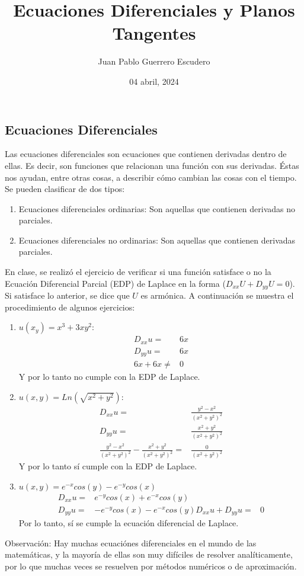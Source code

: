 \documentclass[12pt, letterpaper]{report}
\title{Ecuaciones Diferenciales y Planos Tangentes}
\author{Juan Pablo Guerrero Escudero}
\date{04 abril, 2024}
\begin{document}
\maketitle
\subsection*{Ecuaciones Diferenciales}
Las ecuaciones diferenciales son ecuaciones que contienen derivadas dentro de ellas. Es decir, son funciones 
que relacionan una función con sus derivadas. Éstas nos ayudan, entre otras cosas, a describir cómo cambian las 
cosas con el tiempo. Se pueden clasificar de dos tipos: 
\begin{enumerate}
\item Ecuaciones diferenciales ordinarias: Son aquellas que contienen derivadas no parciales. 
\item Ecuaciones diferenciales no ordinarias: Son aquellas que contienen derivadas parciales. 
\end{enumerate}
En clase, se realizó el ejercicio de verificar si una función satisface o no la Ecuación Diferencial Parcial (EDP) de 
Laplace en la forma ($D_{xx}U + D_{yy}U = 0$). Si satisface lo anterior, se dice que $U$ es armónica. A continuación se 
muestra el procedimiento de algunos ejercicios: \\ 
\begin{enumerate}
\item $u(x_y) = x^3 + 3xy^2$: 
\begin{align*}
    D_{xx}u =& 6x \\
    D_{yy}u =& 6x \\
    6x + 6x \neq& 0
\end{align*} Y por lo tanto no cumple con la EDP de Laplace. 
\item $u(x, y) = Ln(\sqrt{x^2 + y^2})$: 
\begin{align*}
D_{xx}u =& \frac{y^2 - x^2}{(x^2 + y^2)^2}\\
D_{yy}u =& \frac{x^2 + y^2}{(x^2 + y^2)^2} \\
\frac{y^2 - x^2}{(x^2 + y^2)^2} - \frac{x^2 + y^2}{(x^2 + y^2)^2} =& \frac{0}{(x^2 + y^2)^2}
\end{align*} Y por lo tanto sí cumple con la EDP de Laplace. 
\item $u(x, y) = e^{-x}cos(y) -e^{-y}cos(x)$
\begin{align*}
D_{xx}u =& e^{-y}cos(x) + e^{-x}cos(y)\\
D_{yy}u =& -e^{-y}cos(x) - e^{-x}cos(y)
D_{xx}u + D_{yy}u =& 0
\end{align*} Por lo tanto, sí se cumple la ecuación diferencial de Laplace. 
\end{enumerate}
Observación: Hay muchas ecuaciónes diferenciales en el mundo de las matemáticas, y la mayoría de ellas son muy difíciles de 
resolver analíticamente, por lo que muchas veces se resuelven por métodos numéricos o de aproximación. 
\end{document}
